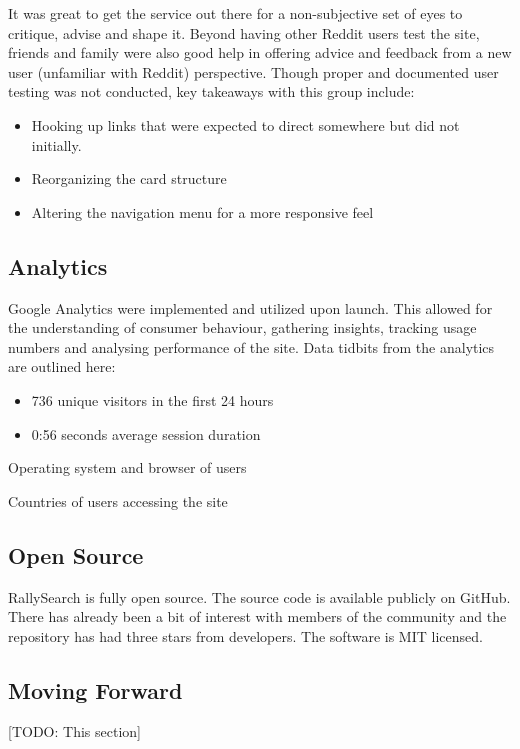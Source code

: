 \documentclass[msc,oneside]{ubcthesis}%
\begin{document}
It was great to get the service out there for a non-subjective set of eyes to critique, advise and shape it. Beyond having other Reddit users test the site, friends and family were also good help in offering advice and feedback from a new user (unfamiliar with Reddit) perspective. Though proper and documented user testing was not conducted, key takeaways with this group include:
\begin{itemize}
\item{Hooking up links that were expected to direct somewhere but did not initially.}
\item{Reorganizing the card structure}
\item{Altering the navigation menu for a more responsive feel}
\end{itemize}

\subsection{Analytics}
Google Analytics were implemented and utilized upon launch. This allowed for the understanding of consumer behaviour, gathering insights, tracking usage numbers and analysing performance of the site. Data tidbits from the analytics are outlined here:
\begin{itemize}
\item{736 unique visitors in the first 24 hours}
\item{0:56 seconds average session duration}
\end{itemize}
\begin{table}[H]
\begin{center}
\caption{Operating system and browser of users}\label{tab:osandbrowser}
\end{center}
\end{table}

\begin{table}[H]
\begin{center}
\caption{Countries of users accessing the site}\label{tab:country}
\end{center}
\end{table}

\subsection{Open Source}
RallySearch is fully open source. The source code is available publicly on GitHub. There has already been a bit of interest with members of the community and the repository has had three stars from developers. The software is MIT licensed. 

\subsection{Moving Forward}
[TODO: This section]

\newpage %
\pagestyle{fancy}\rhead{}\cfoot{}\rfoot{\thepage}

\end{document}
